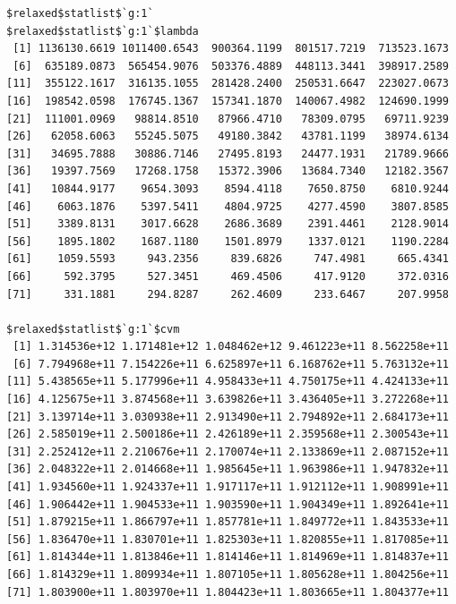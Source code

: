 \documentclass[
]{article}
\begin{document}
\begin{verbatim}
$relaxed$statlist$`g:1`
$relaxed$statlist$`g:1`$lambda
 [1] 1136130.6619 1011400.6543  900364.1199  801517.7219  713523.1673
 [6]  635189.0873  565454.9076  503376.4889  448113.3441  398917.2589
[11]  355122.1617  316135.1055  281428.2400  250531.6647  223027.0673
[16]  198542.0598  176745.1367  157341.1870  140067.4982  124690.1999
[21]  111001.0969   98814.8510   87966.4710   78309.0795   69711.9239
[26]   62058.6063   55245.5075   49180.3842   43781.1199   38974.6134
[31]   34695.7888   30886.7146   27495.8193   24477.1931   21789.9666
[36]   19397.7569   17268.1758   15372.3906   13684.7340   12182.3567
[41]   10844.9177    9654.3093    8594.4118    7650.8750    6810.9244
[46]    6063.1876    5397.5411    4804.9725    4277.4590    3807.8585
[51]    3389.8131    3017.6628    2686.3689    2391.4461    2128.9014
[56]    1895.1802    1687.1180    1501.8979    1337.0121    1190.2284
[61]    1059.5593     943.2356     839.6826     747.4981     665.4341
[66]     592.3795     527.3451     469.4506     417.9120     372.0316
[71]     331.1881     294.8287     262.4609     233.6467     207.9958

$relaxed$statlist$`g:1`$cvm
 [1] 1.314536e+12 1.171481e+12 1.048462e+12 9.461223e+11 8.562258e+11
 [6] 7.794968e+11 7.154226e+11 6.625897e+11 6.168762e+11 5.763132e+11
[11] 5.438565e+11 5.177996e+11 4.958433e+11 4.750175e+11 4.424133e+11
[16] 4.125675e+11 3.874568e+11 3.639826e+11 3.436405e+11 3.272268e+11
[21] 3.139714e+11 3.030938e+11 2.913490e+11 2.794892e+11 2.684173e+11
[26] 2.585019e+11 2.500186e+11 2.426189e+11 2.359568e+11 2.300543e+11
[31] 2.252412e+11 2.210676e+11 2.170074e+11 2.133869e+11 2.087152e+11
[36] 2.048322e+11 2.014668e+11 1.985645e+11 1.963986e+11 1.947832e+11
[41] 1.934560e+11 1.924337e+11 1.917117e+11 1.912112e+11 1.908991e+11
[46] 1.906442e+11 1.904533e+11 1.903590e+11 1.904349e+11 1.892641e+11
[51] 1.879215e+11 1.866797e+11 1.857781e+11 1.849772e+11 1.843533e+11
[56] 1.836470e+11 1.830701e+11 1.825303e+11 1.820855e+11 1.817085e+11
[61] 1.814344e+11 1.813846e+11 1.814146e+11 1.814969e+11 1.814837e+11
[66] 1.814329e+11 1.809934e+11 1.807105e+11 1.805628e+11 1.804256e+11
[71] 1.803900e+11 1.803970e+11 1.804423e+11 1.803665e+11 1.804377e+11


\end{verbatim}
\end{document}
